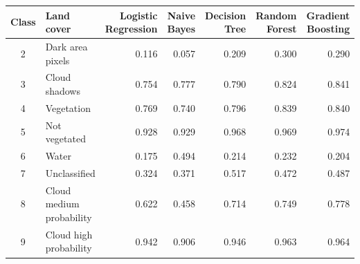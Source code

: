 \begin{tabular}{clrrrrr}
\toprule
Class & Land cover & \makecell{Logistic \\ Regression} & \makecell{Naive \\ Bayes} & \makecell{Decision \\ Tree} & \makecell{Random \\ Forest} & \makecell{Gradient \\ Boosting} \\
\midrule
2 & Dark area pixels & 0.116 & 0.057 & 0.209 & 0.300 & 0.290 \\
3 & Cloud shadows & 0.754 & 0.777 & 0.790 & 0.824 & 0.841 \\
4 & Vegetation & 0.769 & 0.740 & 0.796 & 0.839 & 0.840 \\
5 & Not vegetated & 0.928 & 0.929 & 0.968 & 0.969 & 0.974 \\
6 & Water & 0.175 & 0.494 & 0.214 & 0.232 & 0.204 \\
7 & Unclassified & 0.324 & 0.371 & 0.517 & 0.472 & 0.487 \\
8 & Cloud medium probability & 0.622 & 0.458 & 0.714 & 0.749 & 0.778 \\
9 & Cloud high probability & 0.942 & 0.906 & 0.946 & 0.963 & 0.964 \\
\bottomrule
\end{tabular}
